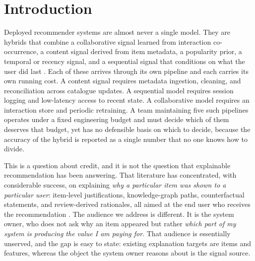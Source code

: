 \documentclass[pdflatex,sn-mathphys-num]{sn-jnl}%
\theoremstyle{thmstyleone}%
\theoremstyle{thmstyletwo}%
\theoremstyle{thmstylethree}%
\begin{document}

\maketitle

\section{Introduction}\label{sec1}

Deployed recommender systems are almost never a single model. They are hybrids that combine a collaborative signal learned from interaction co-occurrence, a content signal derived from item metadata, a popularity prior, a temporal or recency signal, and a sequential signal that conditions on what the user did last \cite{burke2002}. Each of these arrives through its own pipeline and each carries its own running cost. A content signal requires metadata ingestion, cleaning, and reconciliation across catalogue updates. A sequential model requires session logging and low-latency access to recent state. A collaborative model requires an interaction store and periodic retraining. A team maintaining five such pipelines operates under a fixed engineering budget and must decide which of them deserves that budget, yet has no defensible basis on which to decide, because the accuracy of the hybrid is reported as a single number that no one knows how to divide.

This is a question about credit, and it is not the question that explainable recommendation has been answering. That literature has concentrated, with considerable success, on explaining \emph{why a particular item was shown to a particular user}: item-level justifications, knowledge-graph paths, counterfactual statements, and review-derived rationales, all aimed at the end user who receives the recommendation \cite{zhang2020}. The audience we address is different. It is the system owner, who does not ask why an item appeared but rather \emph{which part of my system is producing the value I am paying for}. That audience is essentially unserved, and the gap is easy to state: existing explanation targets are items and features, whereas the object the system owner reasons about is the signal source.
\end{document}
